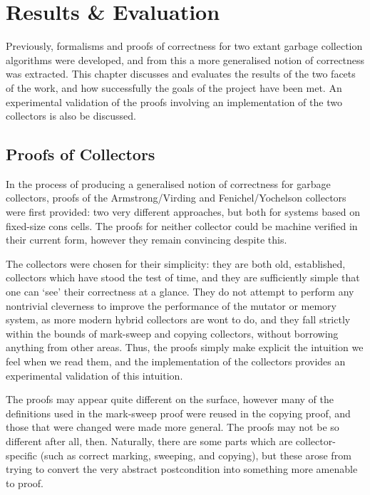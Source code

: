 \chapter{Results \& Evaluation}
\label{sec:results}

Previously, formalisms and proofs of correctness for two extant
garbage collection algorithms were developed, and from this a more
generalised notion of correctness was extracted. This chapter
discusses and evaluates the results of the two facets of the work, and
how successfully the goals of the project have been met. An
experimental validation of the proofs involving an implementation of
the two collectors is also be discussed.

\section{Proofs of Collectors}
\label{sec:results-collectors}

In the process of producing a generalised notion of correctness for
garbage collectors, proofs of the Armstrong/Virding and
Fenichel/Yochelson collectors were first provided: two very different
approaches, but both for systems based on fixed-size cons cells. The
proofs for neither collector could be machine verified in their
current form, however they remain convincing despite this.

The collectors were chosen for their simplicity: they are both old,
established, collectors which have stood the test of time, and they
are sufficiently simple that one can `see' their correctness at a
glance. They do not attempt to perform any nontrivial cleverness to
improve the performance of the mutator or memory system, as more
modern hybrid collectors are wont to do, and they fall strictly within
the bounds of mark-sweep and copying collectors, without borrowing
anything from other areas. Thus, the proofs simply make explicit the
intuition we feel when we read them, and the implementation of the
collectors provides an experimental validation of this intuition.

The proofs may appear quite different on the surface, however many of
the definitions used in the mark-sweep proof were reused in the
copying proof, and those that were changed were made more
general. The proofs may not be so different after all,
then. Naturally, there are some parts which are collector-specific
(such as correct marking, sweeping, and copying), but these arose from
trying to convert the very abstract postcondition into something more
amenable to proof.

